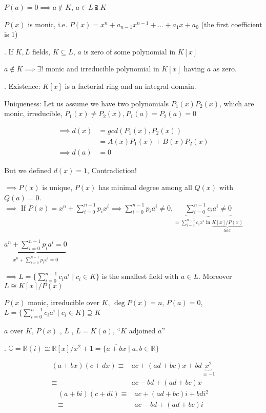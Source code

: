 $P(a) = 0 \implies a\notin K$, $ a \in L \supsetneqq K$

$P(x)$ is monic, i.e. $P(x) = x^n + a_{n-1}x^{n-1} + \ldots + a_1 x + a_0$ (the first coefficient is 1)

\Theorem.
If $K,L$ fields, $K\subseteq L$, $a$ is zero of some polynomial in $K[x]$

$a \notin K \implies \exists!$ monic and irreducible polynomial in $K[x]$ having $a$ as zero.

\Proof.
Existence: $K[x]$ is a factorial ring and an integral domain.

Uniqueness: Let us assume we have two polynomials $P_1(x) P_2(x)$, which are monic, irreducible, $P_1(x) \neq P_2(x), P_1(a) = P_2(a) = 0$

\begin{align*}
  \implies d(x) &= gcd(P_1(x), P_2(x))\\
                &= A(x) P_1(x) + B(x) P_2(x) \\
  \implies d(a) &= 0
\end{align*}

But we defined $d(x) = 1$, Contradiction!

$\implies P(x)$ is unique, $P(x)$ has minimal degree among all $Q(x)$ with $Q(a) = 0$. \\
$\implies$ If $P(x) = x^n + \sum_{i=0}^{n-1} p_i x^i \implies \sum_{i=0}^{n-1} p_i a^i \neq 0, \underbrace{\sum_{i=0}^{n-1} c_i a^i \neq 0}_{\hat{=} \sum_{i=0}^{n-1} c_i x^i \text{ in } \underbrace{K[x]/P(x)}_{\text{field!}}}$

$\underbrace{a^n + \sum_{i=0}^{n-1} p_i a^i = 0}_{\overline{x^n + \sum_{i=0}^{n-1} p_i x^i} = \bar{0}}$

$\implies L = \{ \sum_{i=0}^{n-1} c_i a^i \mid c_i \in K\}$ is the smallest field with $a \in L$. Moreover $L \cong K[x]/P(x)$

\begin{definition}
  $P(x)$ monic, irreducible over $K$, $\deg P(x) = n$, $P(a) = 0$,
  $L = \{ \sum_{i=0}^{n-1} c_i a^i\mid c_i \in K \} \supseteq K$

  $a$  over $K$, $P(x)$ , $L$ , $L = K(a)$, ``$K$ adjoined $a$''
\end{definition}

\Example.
$\mathbb{C} = \mathbb{R}(i) \cong \mathbb{R}[x] / x^2 +1 = \{\overline{a+bx} \mid a,b \in \mathbb{R} \}$

\begin{align*}
  (a + bx)(c+dx)
  \equiv & ac + (ad+bc)x + bd \underbrace{x^2}_{\equiv -1} \\
  \equiv & ac - bd + (ad+bc)x
\end{align*}
\begin{align*}
  (a + bi)(c+di)
  \equiv & ac + (ad+bc)i + bd i^2 \\
  \equiv & ac - bd + (ad+bc)i
\end{align*}

